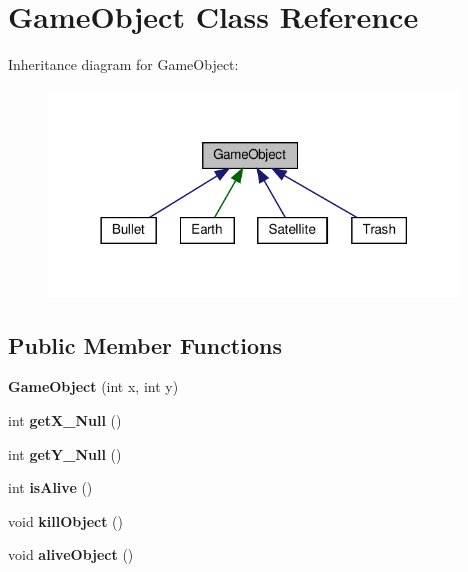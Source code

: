 \hypertarget{class_game_object}{}\section{Game\+Object Class Reference}
\label{class_game_object}


Inheritance diagram for Game\+Object\+:
\nopagebreak
\begin{figure}[H]
\begin{center}
\leavevmode
\includegraphics[width=309pt]{class_game_object__inherit__graph}
\end{center}
\end{figure}
\subsection*{Public Member Functions}
\begin{DoxyCompactItemize}
\item 
\mbox{\label{class_game_object_a00106fe15899343de0805a7d7dc9d766}} 
{\bfseries Game\+Object} (int x, int y)
\item 
\mbox{\label{class_game_object_aefb9850065652a0bb50c0e092aaacf59}} 
int {\bfseries get\+X\+\_\+\+Null} ()
\item 
\mbox{\label{class_game_object_a6c55dbb1345855d35bf8e4c00c8e8bd8}} 
int {\bfseries get\+Y\+\_\+\+Null} ()
\item 
\mbox{\label{class_game_object_a13049dfd6703595d7e422cd7c9e80b47}} 
int {\bfseries is\+Alive} ()
\item 
\mbox{\label{class_game_object_a0c2d5880f60a68cc6a191978094dfc66}} 
void {\bfseries kill\+Object} ()
\item 
\mbox{\label{class_game_object_a8d45ee848362ff0c5b15f03e881486a6}} 
void {\bfseries alive\+Object} ()
\end{DoxyCompactItemize}

